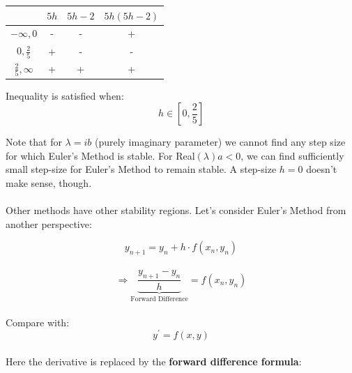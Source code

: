 \documentclass[a4paper,12pt]{report}
\begin{document}
\begin{center}
	\begin{tabular}{c|c|c|c}
	& $5h$ & $5h-2$ & $5h(5h-2)$\\
	\hline
	$- \infty, 0$ & - & - & +\\
	$0, \frac{2}{5}$ & + & - & - \\
	$\frac{2}{5}, \infty$ &+ & + & +
\end{tabular}
\end{center}

	\noindent Inequality is satisfied when:
	$$ h \in [0, \frac{2}{5}]$$
	
	Note that for $\lambda = ib$ (purely imaginary parameter) we cannot find any step size for which Euler's
	Method is stable.  For Real$(\lambda) a < 0$, we can find sufficiently small step-size for Euler's Method to
	remain stable. A step-size $h=0$ doesn't make sense, though.\\ \\
	
	Other methods have other stability regions.  Let's consider Euler's Method from another perspective:
	
	$$ y_{n+1} = y_n + h \cdot f(x_n, y_n)$$ \\
	$$\Rightarrow \underbrace{\frac{y_{n+1} - y_n}{h}}_{\text{Forward Difference}} = f(x_n, y_n) $$ \\
	
	\noindent Compare with:
	$$ y^\prime = f(x,y)$$\\
	
	Here the derivative is replaced by the \textbf{forward difference formula}:
	
\end{document}
